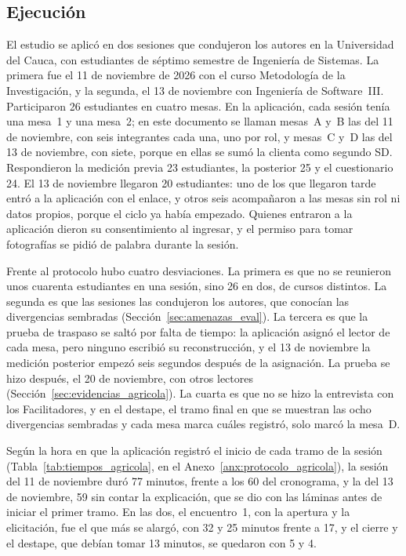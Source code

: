\documentclass[12pt,letterpaper,oneside]{report}
\begin{document}
\subsection{Ejecución}
\label{sec:ejecucion_agricola}
El estudio se aplicó en dos sesiones que condujeron los autores en la
Universidad del Cauca, con estudiantes de séptimo semestre de Ingeniería de
Sistemas. La primera fue el 11 de noviembre de 2026 con el curso Metodología de
la Investigación, y la segunda, el 13 de noviembre con Ingeniería de
Software~III. Participaron 26 estudiantes en cuatro mesas. En la aplicación,
cada sesión tenía una mesa~1 y una mesa~2; en este documento se llaman mesas~A
y~B las del 11 de noviembre, con seis integrantes cada una, uno por rol, y
mesas~C y~D las del 13 de noviembre, con siete, porque en ellas se sumó la
clienta como segundo SD. Respondieron la medición previa 23 estudiantes, la
posterior 25 y el cuestionario 24. El 13 de noviembre llegaron 20 estudiantes:
uno de los que llegaron tarde entró a la aplicación con el enlace, y otros seis
acompañaron a las mesas sin rol ni datos propios, porque el ciclo ya había
empezado. Quienes entraron a la aplicación dieron su consentimiento al ingresar,
y el permiso para tomar fotografías se pidió de palabra durante la sesión.

Frente al protocolo hubo cuatro desviaciones. La primera es que no se reunieron
unos cuarenta estudiantes en una sesión, sino 26 en dos, de cursos distintos. La
segunda es que las sesiones las condujeron los autores, que
conocían las divergencias sembradas (Sección~\ref{sec:amenazas_eval}). La
tercera es que la prueba de traspaso se saltó por falta de tiempo: la aplicación
asignó el lector de cada mesa, pero ninguno escribió su reconstrucción, y el 13
de noviembre la medición posterior empezó seis segundos después de la
asignación. La prueba se hizo después, el 20 de noviembre, con otros lectores
(Sección~\ref{sec:evidencias_agricola}). La cuarta es que no se hizo la
entrevista con los Facilitadores, y en el destape, el tramo final en que se
muestran las ocho divergencias sembradas y cada mesa marca cuáles registró, solo
marcó la mesa~D.

Según la hora en que la aplicación registró el inicio de cada tramo de la sesión
(Tabla~\ref{tab:tiempos_agricola}, en el Anexo~\ref{anx:protocolo_agricola}), la
sesión del 11 de noviembre duró 77 minutos, frente a los 60 del cronograma, y la
del 13 de noviembre, 59 sin contar la explicación, que se dio con las láminas
antes de iniciar el primer tramo. En las dos, el encuentro~1, con la apertura y
la elicitación, fue el que más se alargó, con 32 y 25 minutos frente a 17, y el
cierre y el destape, que debían tomar 13 minutos, se quedaron con 5 y 4.
\end{document}
